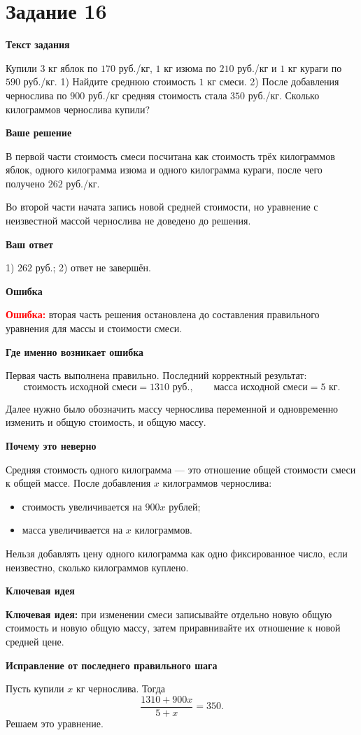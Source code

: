 \documentclass[12pt,a4paper]{article}
\newcommand{\errorlabel}{\textcolor{red}{\textbf{Ошибка:}}}
\newcommand{\keyidea}{\textcolor{blue!60!black}{\textbf{Ключевая идея:}}}
\newcommand{\subhead}[1]{\par\medskip\textbf{#1}\par}
\begin{document}
\newpage
{}\label{task:16}
\section*{Задание 16}

\subhead{Текст задания}
Купили $3$ кг яблок по $170$ руб./кг, $1$ кг изюма по $210$ руб./кг и $1$ кг кураги по $590$ руб./кг. 1) Найдите среднюю стоимость $1$ кг смеси. 2) После добавления чернослива по $900$ руб./кг средняя стоимость стала $350$ руб./кг. Сколько килограммов чернослива купили?

\subhead{Ваше решение}
В первой части стоимость смеси посчитана как стоимость трёх килограммов яблок, одного килограмма изюма и одного килограмма кураги, после чего получено $262$ руб./кг.

Во второй части начата запись новой средней стоимости, но уравнение с неизвестной массой чернослива не доведено до решения.

\subhead{Ваш ответ}
1) $262$ руб.; 2) ответ не завершён.

\subhead{Ошибка}
\errorlabel{} вторая часть решения остановлена до составления правильного уравнения для массы и стоимости смеси.

\subhead{Где именно возникает ошибка}
Первая часть выполнена правильно. Последний корректный результат:
\[
\text{стоимость исходной смеси}=1310\text{ руб.},\qquad
\text{масса исходной смеси}=5\text{ кг}.
\]

Далее нужно было обозначить массу чернослива переменной и одновременно изменить и общую стоимость, и общую массу.

\subhead{Почему это неверно}
Средняя стоимость одного килограмма --- это отношение общей стоимости смеси к общей массе. После добавления $x$ килограммов чернослива:
\begin{itemize}
\item стоимость увеличивается на $900x$ рублей;
\item масса увеличивается на $x$ килограммов.
\end{itemize}
Нельзя добавлять цену одного килограмма как одно фиксированное число, если неизвестно, сколько килограммов куплено.

\subhead{Ключевая идея}
\keyidea{} при изменении смеси записывайте отдельно новую общую стоимость и новую общую массу, затем приравнивайте их отношение к новой средней цене.

\subhead{Исправление от последнего правильного шага}
Пусть купили $x$ кг чернослива. Тогда
\[
\frac{1310+900x}{5+x}=350.
\]
Решаем это уравнение.
\end{document}

